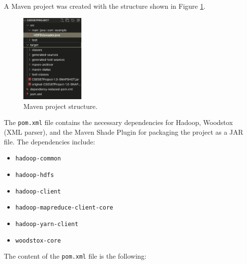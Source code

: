 \documentclass[conference]{IEEEtran}
\begin{document}
A Maven project was created with the structure shown in Figure \ref{fig:maven_structure}.
\begin{figure}[htbp]
    \centerline{\includegraphics[width=0.28\textwidth]{graphics/maven_structure.png}}
    \caption{Maven project structure.}
    \label{fig:maven_structure}
\end{figure}
The \texttt{pom.xml} file contains the necessary dependencies for Hadoop, Woodstox
(XML parser), and the Maven Shade Plugin for packaging the project as a JAR file.
The dependencies include:
\begin{itemize}
    \item \texttt{hadoop-common}
    \item \texttt{hadoop-hdfs}
    \item \texttt{hadoop-client}
    \item \texttt{hadoop-mapreduce-client-core}
    \item \texttt{hadoop-yarn-client}
    \item \texttt{woodstox-core}
\end{itemize}
The content of the \texttt{pom.xml} file is the following:
\end{document}
